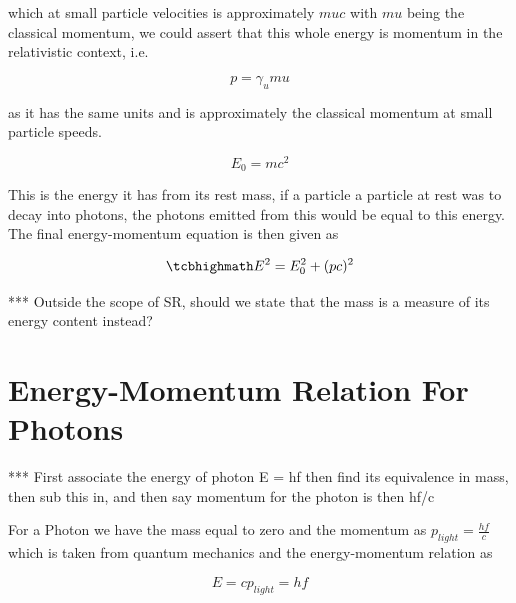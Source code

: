 which at small particle velocities is approximately $muc$ with $mu$ being the classical momentum, we could assert that this whole energy is momentum in the relativistic context, i.e.

\begin{equation}
	p = \gamma_{u} mu
\end{equation}

as it has the same units and is approximately the classical momentum at small particle speeds.

\begin{equation}
	E_0 = mc^2
\end{equation}

This is the energy it has from its rest mass, if a particle a particle at rest was to decay into photons, the photons emitted from this would be equal to this energy. The final energy-momentum equation is then given as

\begin{equation}
	\mhl{
		E^2 = E_0^2 + (pc)^2
	}
\end{equation}

*** Outside the scope of SR, should we state that the mass is a measure of its energy content instead?



\section{Energy-Momentum Relation For Photons}

*** First associate the energy of photon E = hf then find its equivalence in mass, then sub this in, and then say momentum for the photon is then hf/c

For a Photon we have the mass equal to zero and the momentum as $p_{light} = \frac{hf}{c}$ which is taken from quantum mechanics and the energy-momentum relation as

\begin{equation}
	E = c p_{light} = hf
\end{equation}

